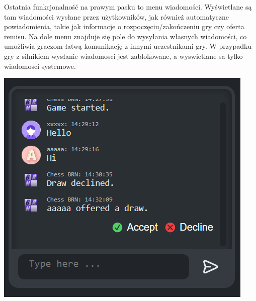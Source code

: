 \documentclass[12pt,a4paper]{article}
\begin{document}
\begin{minipage}[t]{0.45\textwidth} 
    \vspace{0pt} 
    \raggedright 
    Ostatnia funkcjonalność na prawym pasku to menu wiadomości. Wyświetlane są tam wiadomości wysłane przez użytkowników, jak również automatyczne powiadomienia, takie jak informacje o rozpoczęciu/zakończeniu gry czy oferta remisu. Na dole menu znajduje się pole do wysyłania własnych wiadomości, co umożliwia graczom łatwą komunikację z innymi uczestnikami gry. W przypadku gry z silnikiem wysłanie wiadomosci jest zablokowane, a wyswietlane sa tylko wiadomosci systemowe.
\end{minipage} 
\hfill 
\begin{minipage}[t]{0.45\textwidth} 
    \vspace{0pt} 
    \centering 
    \includegraphics[width=\linewidth]{zdj/ins_min_mess.png} 
\end{minipage}

\newpage
\end{document}
